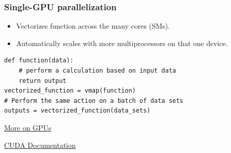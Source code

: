 \begin{frame}[fragile]
    \frametitle{Single-GPU parallelization}
  
    \vspace{0.5em}
    \begin{itemize}
      \item Vectorizes function across the many cores 
      (SMs).
      \item Automatically scales with more 
      multiprocessors on that one device.
    \end{itemize}
  
    \vspace{0.5em}
    \begin{verbatim}
def function(data):
    # perform a calculation based on input data
    return output
vectorized_function = vmap(function)  
# Perform the same action on a batch of data sets
outputs = vectorized_function(data_sets)   
    \end{verbatim}
     {\footnotesize
     \href{https://github.com/stanford-cs336/spring2025-lectures/blob/main/nonexecutable/2025%
     }{More on GPUs}}
  \end{frame}

  \begin{frame}
    \begin{figure}
        \begin{center}
        \end{center}
     \end{figure}
     \footnotesize{
     \href{
        https://docs.nvidia.com/cuda/cuda-c-programming-guide/index.html?highlight=multiple%
        }{CUDA Documentation}
        }
  \end{frame}
  
